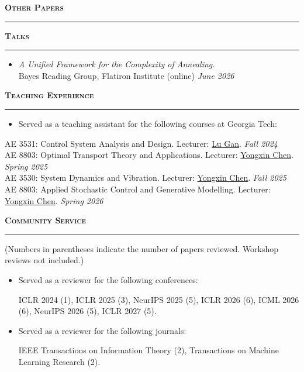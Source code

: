 \documentclass{resume} %
\renewenvironment{rSection}[1]{
\sectionskip
\textcolor{LinkNavy}{\textbf{\textsc{#1}}}
\sectionlineskip
\hrule
\begin{list}{}{
\setlength{\leftmargin}{1.5em}
}
\item[]
}{
\end{list}
}
\begin{document}
\begin{rSection}{Other Papers}
    \itemsep -2pt
    \nocite{*}\leavevmode\printbibliography[heading=none, notcategory=selected]
\end{rSection}


\begin{rSection}{Talks}
\begin{itemize}[leftmargin=0in]
    \item \textit{A Unified Framework for the Complexity of Annealing.} \\
    Bayes Reading Group, Flatiron Institute (online) \hfill {\em June 2026} \\
\end{itemize}
\end{rSection}

\begin{rSection}{Teaching Experience}
\begin{itemize}[leftmargin=0in, itemsep=-2pt]
    \item Served as a teaching assistant for the following courses at Georgia Tech:
\end{itemize}
AE 3531: Control System Analysis and Design.
Lecturer: \href{https://research.gatech.edu/people/lu-gan}{Lu Gan}.
\hfill {\em Fall 2024}
\\
AE 8803: Optimal Transport Theory and Applications. 
Lecturer: \href{https://yongxin.ae.gatech.edu/}{Yongxin Chen}.
\hfill {\em Spring 2025}
\\
AE 3530: System Dynamics and Vibration.
Lecturer: \href{https://yongxin.ae.gatech.edu/}{Yongxin Chen}.
\hfill {\em Fall 2025}
\\
AE 8803: Applied Stochastic Control and Generative Modelling.
Lecturer: \href{https://yongxin.ae.gatech.edu/}{Yongxin Chen}.
\hfill {\em Spring 2026}
\end{rSection}


\begin{rSection}{Community Service} \itemsep -2pt
(Numbers in parentheses indicate the number of papers reviewed. Workshop reviews not included.)
\begin{itemize}[leftmargin=0in]
    \item Served as a reviewer for the following conferences:
    
    ICLR 2024 (1),
    ICLR 2025 (3),
    NeurIPS 2025 (5),
    ICLR 2026 (6),
    ICML 2026 (6),
    NeurIPS 2026 (5),
    ICLR 2027 (5).
    
    \item Served as a reviewer for the following journals:
    
    IEEE Transactions on Information Theory (2),
    Transactions on Machine Learning Research (2).
\end{itemize}
\end{rSection}
\end{document}
